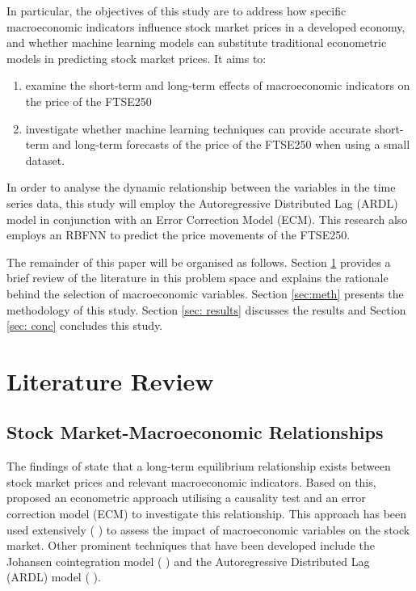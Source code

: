 \documentclass[11pt,a4paper]{article}
\newcommand{\citeboth}[1]{\citeauthor{#1} \citep{#1}}
\begin{document}
In particular, the objectives of this study are to address how specific macroeconomic indicators influence stock market prices in a developed economy, and whether machine learning models can substitute traditional econometric models in predicting stock market prices. It aims to:
\begin{enumerate}
    \item examine the short-term and long-term effects of macroeconomic indicators on the price of the FTSE250
    \item investigate whether machine learning techniques can provide accurate short-term and long-term forecasts of the price of the FTSE250 when using a small dataset.
\end{enumerate}

In order to analyse the dynamic relationship between the variables in the time series data, this study
will employ the Autoregressive Distributed Lag (ARDL) model in conjunction with an Error
Correction Model (ECM). This research also employs an RBFNN to predict the price movements of the FTSE250.

The remainder of this paper will be organised as follows. 
Section \ref{sec:lit} provides a brief review of the literature in this problem space and explains the rationale behind the selection of macroeconomic variables.
Section \ref{sec:meth} presents the methodology of this study. Section \ref{sec: results} discusses the results and Section \ref{sec: conc} concludes
this study.

\section{Literature Review}
\label{sec:lit}

\subsection{Stock Market-Macroeconomic Relationships}

The findings of \citeboth{ChenRollRoss1986} state that a long-term equilibrium relationship 
exists between stock market prices and relevant macroeconomic indicators. Based on this, 
\citeboth{EngleGranger1987} proposed an econometric approach utilising a causality test and an 
error correction model (ECM) to investigate this relationship. This approach has been used extensively (\citeboth{QuadriMasih, Plíhal2016,olomu2015}) to assess the impact of macroeconomic variables on the stock market. 
Other prominent techniques that have been developed include the Johansen cointegration model (\citeboth{YadavKheraMishra2021,Ozcan2012,ChistiShakeelGanai2020}) and the Autoregressive Distributed Lag (ARDL) model (\citeboth{khan2018,demir2019,neifar2023}).
\end{document}
